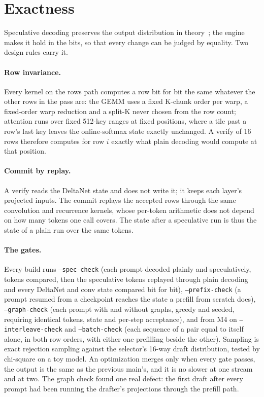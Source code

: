 \documentclass[11pt]{article}
\newcommand{\code}[1]{\texttt{#1}}
\begin{document}
\section{Exactness}
\label{sec:exact}

Speculative decoding preserves the output distribution in theory~\cite{leviathan2023speculative,chen2023speculative}; the engine makes it hold
in the bits, so that every change can be judged by equality. Two design rules carry it.

\paragraph{Row invariance.}
Every kernel on the rows path computes a row bit for bit the same whatever the other rows in the pass are: the GEMM uses a
fixed K-chunk order per warp, a fixed-order warp reduction and a split-K never chosen from the row count; attention runs
over fixed 512-key ranges at fixed positions, where a tile past a row's last key leaves the online-softmax state exactly
unchanged. A verify of 16 rows therefore computes for row $i$ exactly what plain decoding would compute at that position.

\paragraph{Commit by replay.}
A verify reads the DeltaNet state and does not write it; it keeps each layer's projected inputs. The commit replays the
accepted rows through the same convolution and recurrence kernels, whose per-token arithmetic does not depend on how many
tokens one call covers. The state after a speculative run is thus the state of a plain run over the same tokens.

\paragraph{The gates.}
Every build runs \code{--spec-check} (each prompt decoded plainly and speculatively, tokens compared, then the speculative
tokens replayed through plain decoding and every DeltaNet and conv state compared bit for bit), \code{--prefix-check} (a
prompt resumed from a checkpoint reaches the state a prefill from scratch does), \code{--graph-check} (each prompt with and
without graphs, greedy and seeded, requiring identical tokens, state and per-step acceptance), and from M4 on
\code{--interleave-check} and \code{--batch-check} (each sequence of a pair equal to itself alone, in both row orders,
with either one prefilling beside the other). Sampling is exact rejection sampling against the selector's 16-way draft
distribution, tested by chi-square on a toy model. An optimization merges only when every gate passes, the output is the
same as the previous main's, and it is no slower at one stream and at two. The graph check found one real defect: the first
draft after every prompt had been running the drafter's projections through the prefill path.
\end{document}

